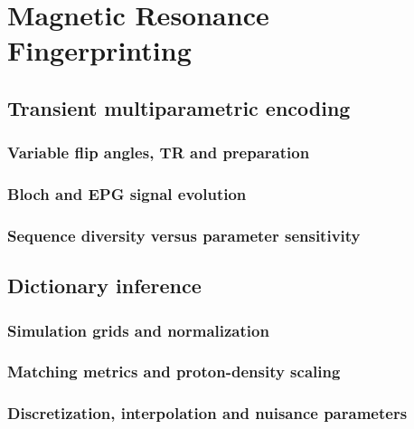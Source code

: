\chapter{Magnetic Resonance Fingerprinting}
\label{ch:12}

\section{Transient multiparametric encoding}
\label{sec:12:transient-multiparametric-encoding}
\subsection{Variable flip angles, TR and preparation}
\subsection{Bloch and EPG signal evolution}
\subsection{Sequence diversity versus parameter sensitivity}

\section{Dictionary inference}
\label{sec:12:dictionary-inference}
\subsection{Simulation grids and normalization}
\subsection{Matching metrics and proton-density scaling}
\subsection{Discretization, interpolation and nuisance parameters}

